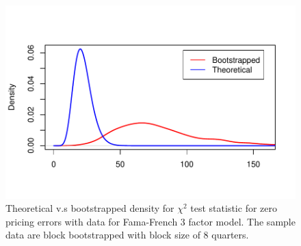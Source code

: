 \documentclass[12pt]{article}
\begin{document}
\begin{enumerate}
\begin{figure}[htbp]
\begin{center}
\includegraphics[scale=0.81]{bootstrap.pdf}
\caption{Theoretical v.s bootstrapped density for $\chi^2$ test statistic for zero pricing errors with data for Fama-French 3 factor model. The sample data are block bootstrapped with block size of 8 quarters.}
\label{fig:boot}
\end{center}
\end{figure}


\end{enumerate}


\end{document}
